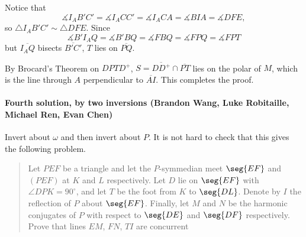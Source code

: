 Notice that \[\measuredangle I_AB'C'=\measuredangle I_ACC'=\measuredangle I_ACA=\measuredangle BIA=\measuredangle DFE,\]so $\triangle I_AB'C'\sim\triangle DFE$. Since \[\measuredangle B'I_AQ=\measuredangle B'BQ=\measuredangle FBQ=\measuredangle FPQ=\measuredangle FPT\]but $\overline{I_AQ}$ bisects $\overline{B'C'}$, $T$ lies on $\overline{PQ}$.

By Brocard's Theorem on $DPTD^+$, $S=\overline{DD^+}\cap\overline{PT}$ lies on the polar of $M$, which is the line through $A$ perpendicular to $\overline{AI}$. This completes the proof.

\paragraph{Fourth solution, by two inversions (Brandon Wang, Luke Robitaille, Michael Ren, Evan Chen)}     Invert about $\omega$ and then invert about $P$. It is not hard to check that this gives the following problem.
\begin{quote}
    Let $PEF$ be a triangle and let the $P$-symmedian meet $\seg{EF}$ and $(PEF)$ at $K$ and $L$ respectively. Let $D$ lie on $\seg{EF}$ with $\angle DPK=90^\circ$, and let $T$ be the foot from $K$ to $\seg{DL}$. Denote by $I$ the reflection of $P$ about $\seg{EF}$. Finally, let $M$ and $N$ be the harmonic conjugates of $P$ with respect to $\seg{DE}$ and $\seg{DF}$ respectively. Prove that lines $EM$, $FN$, $TI$ are concurrent
\end{quote}
